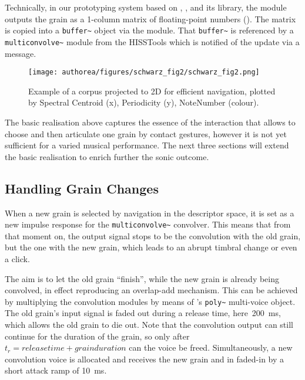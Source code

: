 Technically, in our prototyping system based on , , and its   library, the  module outputs the grain as a 1-column matrix of floating-point numbers ().  The matrix is copied into a \verb|buffer~| object via the  module.
That \verb|buffer~| is referenced by a \verb|multiconvolve~| module from the HISSTools which is notified of the update via a message.

\begin{figure}[htb]
\begin{center}
\texttt{[image: authorea/figures/schwarz\_fig2/schwarz\_fig2.png]}
\caption{Example of a corpus projected to 2D for efficient navigation, plotted by Spectral Centroid (x), Periodicity (y), NoteNumber (colour).}\label{fig:corpus}
\end{center}
\end{figure}

The basic realisation above captures the essence of the interaction that allows to choose and then articulate one grain by contact gestures, however it is not yet sufficient for a varied musical performance.  The next three sections will extend the basic realisation to enrich further the sonic outcome.


\subsection{Handling Grain Changes}\label{sec:set}

\begin{sloppypar}
When a new grain is selected by navigation in the descriptor space, it is set as a new impulse response for the \verb|multiconvolve~| convolver.  This means that from that moment on, the output signal stops to be the convolution with the old grain, but the one with the new grain, which leads to an abrupt timbral change or even a click.
\end{sloppypar}

The aim is to let the old grain ``finish'', while the new grain is already being convolved, in effect reproducing an overlap-add mechanism.  This can be achieved by multiplying the convolution modules by means of \maxmsp's \verb|poly~| multi-voice object.  The old grain's input signal is faded out during a release time, here~200~ms, which allows the old grain to die out.  Note that the convolution output can still continue for the duration of the grain, so only after $t_r = release time + grain duration$ can the voice be freed.  Simultaneously, a new convolution voice is allocated and receives the new grain and in faded-in by a short attack ramp of 10~ms.

